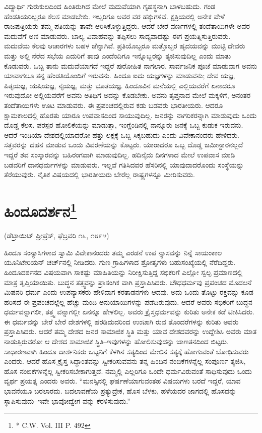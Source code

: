 ವಿದ್ಯಾರ್ಥಿ ಗುರುಕುಲದಿಂದ ಹಿಂತಿರುಗಿದ ಮೇಲೆ ಮದುವೆಯಾಗಿ ಗೃಹಸ್ಥನಾಗಿ ಬಾಳಬಹುದು. ಗಂಡ ಹೆಂಡತಿಯರಿಬ್ಬರೂ ಕೆಲಸ ಮಾಡಬೇಕು. ಇಬ್ಬರಿಗೂ ಅವರ ವರ ಹಕ್ಕುಗಳಿವೆ. ಕ್ಷತ್ರಿಯರಲ್ಲಿ ಅನೇಕ ವೇಳೆ ರಾಜಪುತ್ರಿಯರು ತಮ್ಮ ಪತಿಯನ್ನು ತಾವೇ ಆರಿಸಿಕೊಳ್ಳುತ್ತಿದ್ದರು. ಆದರೆ ಬೇರೆ ವರ್ಣಗಳಲ್ಲಿ ತಂದೆತಾಯಿಗಳೇ ಅವರ ಮದುವೆಗೆ ಅಣಿ ಮಾಡುವರು. ಬಾಲ್ಯ ವಿವಾಹವನ್ನು ತಪ್ಪಿಸಲು ಸಾದ್ಯವಾದಷ್ಟು ಈಗ ಪ್ರಯತ್ನಿಸುತ್ತಿರುವರು. ಮದುವೆಯ ಕೆಲವು ಆಚಾರಗಳು ಬಹಳ ಚೆನ್ನಾಗಿವೆ. ಪ್ರತಿಯೊಬ್ಬರೂ ಮತ್ತೊಬ್ಬರ ಹೃದಯವನ್ನು ಮುಟ್ಟಿ ದೇವರು ಮತ್ತು ಅಲ್ಲಿ ನೆರೆದ ಸಭೆಯ ಎದುರಿಗೆ ತಾವು ಎಂದೆಂದಿಗೂ ಇನ್ನೊಬ್ಬರನ್ನು ತ್ಯಜಿಸುವುದಿಲ್ಲ ಎಂದು ಮಾತು ಕೊಡುವರು. ಒಬ್ಬ ತಾನು ಮದುವೆಯಾಗದೆ ಇದ್ದರೆ ಪುರೋಹಿತ ನಾಗಲಾರ. ಸಾರ್ವಜನಿಕ ಪೂಜೆ ಮಾಡುವಾಗ ಅವನು ಯಾವಾಗಲೂ ತನ್ನ ಹೆಂಡತಿಯೊಂದಿಗೆ ಇರುವನು. ಹಿಂದೂ ಐದು ಯಜ್ಞಗಳನ್ನು ಮಾಡುವನು; ದೇವ ಯಜ್ಞ, ಪಿತೃಯಜ್ಞ, ಋಷಿಯಜ್ಞ, ನೃಯಜ್ಞ, ಮತ್ತು ಭೂತಯಜ್ಞ. ಹಿಂದೂವಿನ ಮನೆಯಲ್ಲಿ ಎಲ್ಲಿಯವರೆಗೆ ಏನಾದರೂ ಇರುವುದೋ ಅಲ್ಲಿಯವರೆಗೆ ಅವನು ಅತಿಥಿಗೆ ಅದನ್ನು ಕೊಡಬೇಕು. ಅವನು ತೃಪ್ತನಾದ ಮೇಲೆ ಮಕ್ಕಳಿಗೆ, ಅನಂತರ ತಂದೆತಾಯಿಗಳು ಊಟ ಮಾಡುವರು. ಈ ಪ್ರಪಂಚದಲ್ಲಿರುವ ಕಡು ಬಡವರು ಭಾರತೀಯರು. ಆದರೂ ಕ್ಷಾಮಕಾಲದಲ್ಲಿ ಹೊರತು ಯಾರೂ ಉಪವಾಸದಿಂದ ಸಾಯುವುದಿಲ್ಲ. ಜನರನ್ನು ನಾಗರಿಕರನ್ನಾಗಿ ಮಾಡುವುದು ಒಂದು ದೊಡ್ಡ ಕೆಲಸ. ಪರಸ್ಪರ ಹೋಲಿಕೆಯನ್ನು ಮಾಡುತ್ತಾ, ಇಂಗ್ಲೆಂಡಿನಲ್ಲಿ ನಾನ್ನೂರು ಜನಕ್ಕೆ ಒಬ್ಬ ಕುಡುಕ ಇರುವನು. ಆದರೆ ಇಂಡಿಯಾ ದೇಶದಲ್ಲಿಯಾದರೋ ಹತ್ತು ಲಕ್ಷಕ್ಕೆ ಒಬ್ಬ ಸಿಕ್ಕಬಹುದು ಎಂದು ವಿವೇಕಾನಂದರು ಹೇಳಿದರು. ಸತ್ತವರನ್ನು ದಹನ ಮಾಡುವ ಒಂದು ವಿವರಣೆಯನ್ನು ಕೊಟ್ಟರು. ಯಾರಾದರೂ ಒಬ್ಬ ದೊಡ್ಡ ಜಮೀನ್ದಾರನಲ್ಲದೆ ಇದ್ದರೆ ಶವ ಸಂಸ್ಕಾರವನ್ನು ಬಹಿರಂಗವಾಗಿ ಮಾಡುವುದಿಲ್ಲ. ಹದಿನೈದು ದಿನಗಳಾದ ಮೇಲೆ ಉಪವಾಸ ಮಾಡಿ ಬಡವರಿಗೆ ದಾನಧರ್ಮಗಳನ್ನು ಮಾಡುವರು. ಇಲ್ಲವೆ ಗತಿಸಿದವರ ಹೆಸರಿನಲ್ಲಿ ಯಾವುದಾದರೊಂದು ಸಂಸ್ಥೆಯನ್ನು ತೆರೆಯುವುರು. ನೈತಿಕ ವಿಷಯದಲ್ಲಿ ಭಾರತೀಯರು ಬೇರೆಲ್ಲ ರಾಷ್ಟ್ರಗಳನ್ನೂ ಮೀರಿಸುವರು.

\delimiter


\section{ಹಿಂದೂದರ್ಶನ\protect\footnote{* C.W. Vol. III P. 492}}

\begin{center}
(ಡೆಟ್ರಾಯಿಟ್​ ಫ್ರೀಪ್ರೆಸ್​, ಫೆಬ್ರವರಿ ೧೬, ೧೮೯೪)
\end{center}

ಹಿಂದೂ ಸಂನ್ಯಾಸಿಗಳಾದ ಸ್ವಾಮಿ ವಿವೇಕಾನಂದರು ತಮ್ಮ ಎರಡನೆ ಉಪ ನ್ಯಾಸವನ್ನು ನಿನ್ನೆ ಸಾಯಂಕಾಲ ಯೂನಿಟೇರಿಯನ್​ ಚರ್ಚ್​ನಲ್ಲಿ ನೀಡಿದರು. ಗುಣ ಗ್ರಾಹಿಗಳಾದ ಶ್ರೋತೃಗಳು ಬಹುಸಂಖ್ಯೆಯಲ್ಲಿ ನೆರೆದಿದ್ದರು. ಹಿಂದೂದರ್ಶನದ ವಿಷಯವಾಗಿ ಸಾಕಷ್ಟು ಮಾಹಿತಿಯನ್ನು ನಿರೀಕ್ಷಿಸುತ್ತಿದ್ದ ಸಭಿಕರಿಗೆ ಎಲ್ಲೋ ಸ್ವಲ್ಪ ಪ್ರಮಾಣದಲ್ಲಿ ಮಾತ್ರ ತೃಪ್ತಿಯಾಯಿತು. ಬುದ್ಧನ ತತ್ತ್ವವನ್ನು ಪ್ರಾಸಂಗಿಕ ವಾಗಿ ಪ್ರಸ್ತಾಪಿಸಿದರು. ಬೌಧಧರ್ಮವು ಪ್ರಪಂಚದ ಮೊದಲನೆ ಮಿಷನರಿ ಧರ್ಮ ಎಂದು ಉಪನ್ಯಾಸಕರು ಹೇಳಿದಾಗ ಕರತಾಡನಗಳು ಆದವು. ಅದು ಒಂದು ತೊಟ್ಟು ರಕ್ತವನ್ನು ಕೂಡ ಹರಿಸದೆ ಈ ಪ್ರಪಂಚದಲ್ಲೆಲ್ಲ ಹೆಚ್ಚು ಮಂದಿ ಅನುಯಾಯಿಗಳನ್ನು ಪಡೆದಿರುವುದು. ಆದರೆ ಅವರು ಸಭಿಕರಿಗೆ ಬುದ್ಧನ ಧರ್ಮವನ್ನಾಗಲೀ, ತತ್ತ್ವ ವನ್ನಾಗಲ್ಲೀ ಏನನ್ನೂ ಹೇಳಲಿಲ್ಲ. ಅವರು ಕ್ರೈಸ್ತಧರ್ಮವನ್ನು ಕುರಿತು ಅನೇಕ ಕಡೆ ಟೀಕಿಸಿದರು. ಈ ಧರ್ಮವನ್ನು ಬೇರೆ ಬೇರೆ ದೇಶಗಳಲ್ಲಿ ಹರಡಿದುದರಿಂದ ಉಂಟಾಗಿ ರುವ ತೊಂದರೆಗಳನ್ನು ಕುರಿತು ಅವರು ಪ್ರಸ್ತಾಪಿಸಿದರು. ಆದರೆ ತಮ್ಮ ದೇಶದ ಜನರ ಸಾಮಾಜಿಕ ಸ್ಥಿತಿ ಮತ್ತು ಯಾವ ದೇಶದವರನ್ನು ಉದ್ದೇಶಿಸಿ ಅವರು ಮಾತ ನಾಡುತ್ತಿರುವರೋ ಆ ದೇಶದ ಸಾಮಾಜಿಕ ಸ್ಥಿತಿ–ಇವುಗಳನ್ನು ಹೋಲಿಸುವುದನ್ನು ಜಾಣತನದಿಂದ ಬಿಟ್ಟರು. ಸಾಧಾರಣವಾಗಿ ಹಿಂದೂ ದಾರ್ಶನಿಕರು ಒಬ್ಬನಿಗೆ ಕೆಳಗಿನ ಸತ್ಯದಿಂದ ಮೇಲಿನ ಸತ್ಯಕ್ಕೆ ಹೋಗುವಂತೆ ಬೋಧಿಸುವರು ಎಂದರು. ಆದರೆ ಹೊಸ ಕ್ರೈಸ್ತ ಸಿದ್ಧಾಂತವನ್ನು ಸ್ವೀಕರಿಸುವವನು ತನ್ನ ಹಿಂದಿನ ನಂಬಿಕೆಗಳನ್ನೆಲ್ಲ ಸಂಪೂರ್ಣ ತ್ಯಜಿಸಿ, ಹೊಸ ನಂಬಿಕೆಗಳನ್ನೆಲ್ಲ ಸ್ವೀಕರಿಸಬೇಕಾಗುತ್ತದೆ. ನಮ್ಮಲ್ಲಿ ಎಲ್ಲರಿಗೂ ಒಂದೇ ಧರ್ಮವಿರುವಂತೆ ಸಾಧಿಸುವುದು ಒಂದು ವ್ಯರ್ಥ ಪ್ರಯತ್ನ ಎಂದರು ಅವರು. “ಮನಸ್ಸಿನಲ್ಲಿ ಘರ್ಷಣೆಯಾಗುವಂತಹ ವಿಷಯಗಳು ಬರದೆ ಇದ್ದರೆ, ಯಾವ ಭಾವನೆಯೂ ಬರಲಾರದು. ಬದಲಾವಣೆಯ ಪ್ರತ್ಯುದ್ರೇಕ, ಹೊಸ ಬೆಳಕು, ಹಳೆಯದರ ಜಾಗದಲ್ಲಿ ಹೊಸದನ್ನು ಸ್ಥಾಪಿಸುವುದು–ಇವೇ ಭಾವೋದ್ವೇಗ ವನ್ನು ಕೆರಳಿಸುವುದು.”


